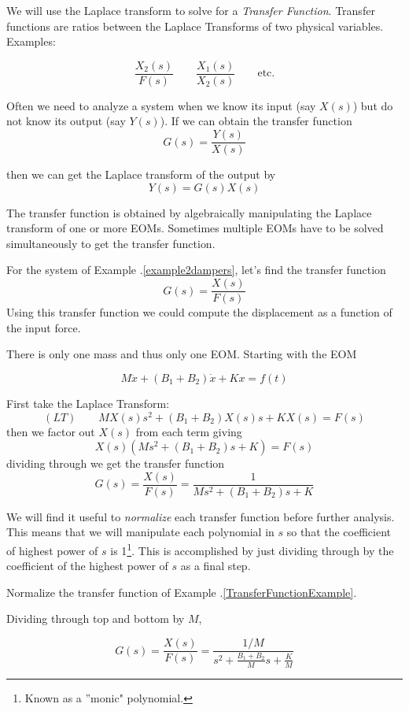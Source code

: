 We will use the Laplace transform to solve for a {\it Transfer Function}.   Transfer functions are ratios between the Laplace Transforms of two physical variables.  Examples:

\[
\frac{X_2(s)}{F(s)} \qquad
\frac{X_1(s)}{X_2(s)} \qquad \mathrm{etc.}
\]

Often we need to analyze a system when we know its input (say $X(s)$) but do not know its output (say $Y(s)$).  If we can obtain the transfer function
\[
G(s) = \frac{Y(s)}{X(s)}
\]

then we can get the Laplace transform of the output by
\[
Y(s) = G(s)X(s)
\]

The transfer function is obtained by algebraically manipulating the Laplace transform of one or more EOMs.
Sometimes multiple EOMs have to be solved simultaneously to get the transfer function.

\begin{ExampleSmall}\label{TransferFunctionExample}
For the system of Example \thechapter.\ref{example2dampers}, let's find the transfer function
\[
G(s) = \frac {X(s)}{F(s)}
\]
Using this transfer function we could compute the displacement as a function of the input force.


There is only one mass and thus only one EOM.  Starting with the EOM

\[
M\ddot{x} + (B_1+B_2)\dot{x}+Kx = f(t)
\]

First take the Laplace Transform:
\[
(LT) \qquad   MX(s)s^2 + (B_1+B_2)X(s)s + KX(s) = F(s)
\]
then we factor out $X(s)$ from each term giving
\[
X(s)\left( Ms^2 +(B_1+B_2)s + K \right) = F(s)
\]
dividing through we get the transfer function
\[
G(s) = \frac {X(s)}{F(s)} = \frac {1}{Ms^2 + (B_1+B_2)s + K }
\]

\end{ExampleSmall}


We will find it useful to {\it normalize} each transfer function before further analysis.   This means that we will manipulate each polynomial in $s$ so that the coefficient of  highest power of $s$ is 1\footnote{Known as a ''monic" polynomial.}.    This is accomplished by just dividing through by the coefficient of the highest power of $s$ as a final step.


\begin{ExampleSmall}
Normalize the transfer function of Example \thechapter.\ref{TransferFunctionExample}.

Dividing through top and bottom by $M$,

\[
G(s) = \frac {X(s)}{F(s)} = \frac {1/M}{s^2 + \frac{B_1+B_2}{M}s + \frac{K}{M} }
\]
\end{ExampleSmall}



